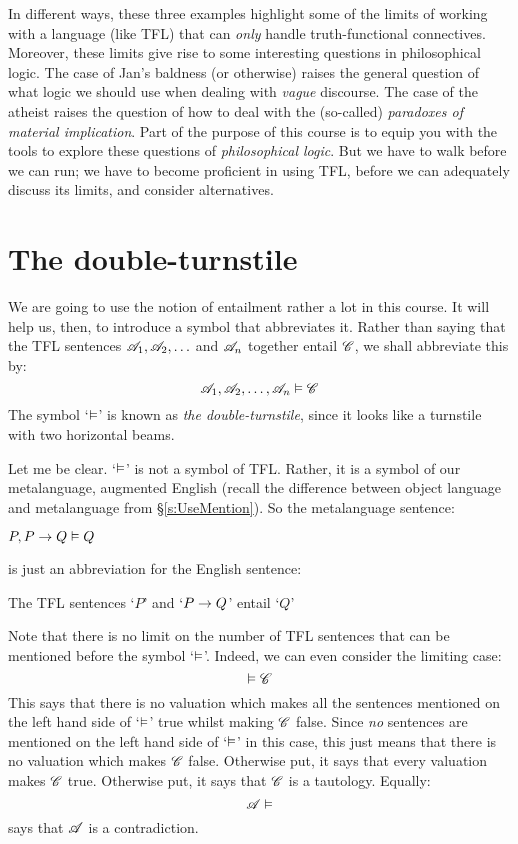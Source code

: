 In different ways, these three examples highlight some of the limits of working with a language (like TFL) that can \emph{only} handle truth-functional connectives. Moreover, these limits give rise to some interesting questions in philosophical logic. The case of Jan's baldness (or otherwise) raises the general question of what logic we should use when dealing with \emph{vague} discourse. The case of the atheist raises the question of how to deal with the (so-called) \emph{paradoxes of material implication}. Part of the purpose of this course is to equip you with the tools to explore these questions of \emph{philosophical logic}. But we have to walk before we can run; we have to become proficient in using TFL, before we can adequately discuss its limits, and consider alternatives. 

\section{The double-turnstile}
We are going to use the notion of entailment rather a lot in this course. It will help us, then, to introduce a symbol that abbreviates it. Rather than saying that the TFL sentences $\mathscr{A}_1, \mathscr{A}_2, \ldots$ and $\mathscr{A}_n$ together entail $\mathscr{C}$, we shall abbreviate this by:
	$$\mathscr{A}_1, \mathscr{A}_2, \ldots, \mathscr{A}_n \vDash \mathscr{C}$$
The symbol `$\vDash$' is known as \emph{the double-turnstile}, since it looks like a turnstile with two horizontal beams.

Let me be clear. `$\vDash$' is not a symbol of TFL. Rather, it is a symbol of our metalanguage, augmented English (recall the difference between object language and metalanguage from \S\ref{s:UseMention}). So the metalanguage sentence:
	\begin{ebullet}
		\item $P, P \rightarrow Q \vDash Q$
	\end{ebullet}
is just an abbreviation for the English sentence: 
	\begin{ebullet}
		\item The TFL sentences `$P$' and `$P \rightarrow Q$' entail `$Q$'
	\end{ebullet}
Note that there is no limit on the number of TFL sentences that can be mentioned before the symbol `$\vDash$'. Indeed, we can even consider the limiting case:
	$$\vDash \mathscr{C}$$
This says that there is no valuation which makes all the sentences mentioned on the left hand side of `$\vDash$' true whilst making $\mathscr{C}$ false. Since \emph{no} sentences are mentioned on the left hand side of `$\vDash$' in this case, this just means that there is no valuation which makes $\mathscr{C}$ false. Otherwise put, it says that every valuation makes $\mathscr{C}$ true. Otherwise put, it says that $\mathscr{C}$ is a tautology. Equally:
	$$\mathscr{A} \vDash$$
says that $\mathscr{A}$ is a contradiction.

